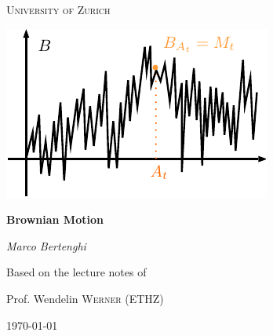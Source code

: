 \documentclass[12pt,a4paper, twoside]{article}
\author{Marco Bertenghi}
\date{}
\theoremstyle{definition}
\begin{document}
\begin{titlepage}
	\centering
	
	{\scshape\LARGE University of Zurich \par}
	\vspace{2cm}
\includegraphics[width=.8\textwidth]{logo.pdf}\par\vspace{1cm}
	\vspace{1cm}
	{\huge\bfseries Brownian Motion\par}
	\vspace{2cm}
	{\Large\itshape Marco Bertenghi\par}
	\vfill
	Based on the lecture notes of \par
	Prof. Wendelin \textsc{Werner} (ETHZ)

	\vfill

	{\large \today\par}
\end{titlepage}
\newpage


\tableofcontents

\newpage




\newpage

\newpage

\newpage

\newpage

\newpage

\newpage

\newpage

\newpage

\newpage

\end{document}
